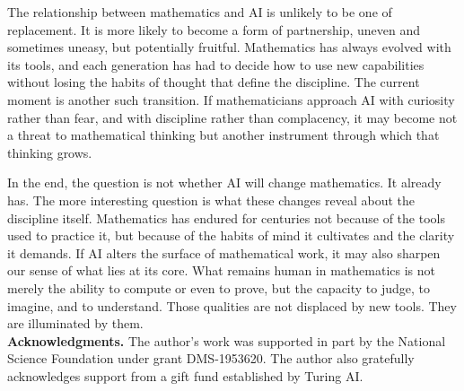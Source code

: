 \documentclass[12pt]{article}
\begin{document}
The relationship between mathematics and AI is unlikely to be one of replacement. It is more likely to become a form of partnership, uneven and sometimes uneasy, but potentially fruitful. Mathematics has always evolved with its tools, and each generation has had to decide how to use new capabilities without losing the habits of thought that define the discipline. The current moment is another such transition. If mathematicians approach AI with curiosity rather than fear, and with discipline rather than complacency, it may become not a threat to mathematical thinking but another instrument through which that thinking grows.

In the end, the question is not whether AI will change mathematics. It already has. The more interesting question is what these changes reveal about the discipline itself. Mathematics has endured for centuries not because of the tools used to practice it, but because of the habits of mind it cultivates and the clarity it demands. If AI alters the surface of mathematical work, it may also sharpen our sense of what lies at its core. What remains human in mathematics is not merely the ability to compute or even to prove, but the capacity to judge, to imagine, and to understand. Those qualities are not displaced by new tools. They are illuminated by them. \\

{\bf Acknowledgments.} The author’s work was supported in part by the National Science Foundation under grant DMS-1953620. The author also gratefully acknowledges support from a gift fund established by Turing AI.
\end{document}
